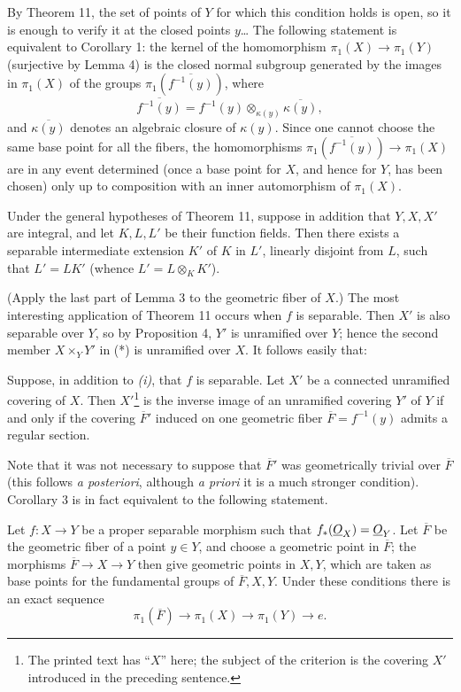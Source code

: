 By Theorem 11, the set of points of $Y$ for which this condition holds is open,
so it is enough to verify it at the closed points $y$\ldots{} The following
statement is equivalent to Corollary 1: the kernel of the homomorphism
$\pi_1(X)\longrightarrow\pi_1(Y)$ (surjective by Lemma 4) is the closed normal
subgroup generated by the images in $\pi_1(X)$ of the groups
$\pi_1(\overline{f^{-1}(y)})$, where
\[
  \overline{f^{-1}(y)}
  =f^{-1}(y)\otimes_{\kappa(y)}\overline{\kappa(y)},
\]
and $\overline{\kappa(y)}$ denotes an algebraic closure of $\kappa(y)$. Since
one cannot choose the same base point for all the fibers, the homomorphisms
$\pi_1(\overline{f^{-1}(y)})\longrightarrow\pi_1(X)$ are in any event
determined (once a base point for $X$, and hence for $Y$, has been chosen) only
up to composition with an inner automorphism of $\pi_1(X)$.

 Under the general hypotheses of Theorem 11, suppose in
addition that $Y,X,X'$ are integral, and let $K,L,L'$ be their function fields.
Then there exists a separable intermediate extension $K'$ of $K$ in $L'$,
linearly disjoint from $L$, such that $L'=LK'$ (whence
$L'=L\otimes_K K'$).

(Apply the last part of Lemma 3 to the geometric fiber of $X$.) The most
interesting application of Theorem 11 occurs when $f$ is separable. Then $X'$
is also separable over $Y$, so by Proposition 4, $Y'$ is unramified over $Y$;
hence the second member $X\times_Y Y'$ in (*) is unramified over $X$. It
follows easily that:

 Suppose, in addition to \textit{(i)}, that $f$ is
separable. Let $X'$ be a connected unramified covering of $X$. Then $X'$\footnote{The
printed text has “$X$” here; the subject of the criterion is the covering $X'$
introduced in the preceding sentence.} is
the inverse image of an unramified covering $Y'$ of $Y$ if and only if the
covering $\overline F'$ induced on one geometric fiber
$\overline F=f^{-1}(y)$ admits a regular section.

Note that it was not necessary to suppose that $\overline F'$ was
geometrically trivial over $\overline F$ (this follows \textit{a posteriori},
although \textit{a priori} it is a much stronger condition). Corollary 3 is in
fact equivalent to the following statement.

 Let $f:X\longrightarrow Y$ be a proper separable
morphism such that $f_*(\underline{O}_X)=\underline{O}_Y$. Let $\overline F$ be the geometric
fiber of a point $y\in Y$, and choose a geometric point in $\overline F$; the
morphisms $\overline F\longrightarrow X\longrightarrow Y$ then give geometric
points in $X,Y$, which are taken as base points for the fundamental groups of
$\overline F,X,Y$. Under these conditions there is an exact sequence
\[
  \boxed{
    \pi_1(\overline F)\longrightarrow\pi_1(X)
    \longrightarrow\pi_1(Y)\longrightarrow e
  }.
\]

